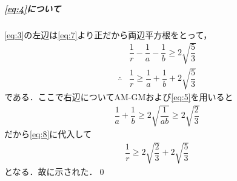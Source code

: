 \documentclass[../../main.tex]{subfiles}
\begin{document}
\subparagraph{\cref{eq:4}について}

\cref{eq:3}の左辺は\cref{eq:7}より正だから両辺平方根をとって，
\begin{align}
  & \dfrac{1}{r}-\dfrac{1}{a}-\dfrac{1}{b}\ge 2\sqrt{\dfrac{5}{3}} \\
  \therefore
  & \dfrac{1}{r} \ge \dfrac{1}{a} + \dfrac{1}{b} + 2\sqrt{\dfrac{5}{3}} \label{eq:8}
\end{align}
である．ここで右辺についてAM-GMおよび\cref{eq:5}を用いると
\begin{align}
  \dfrac{1}{a} + \dfrac{1}{b} \ge 2\sqrt{\dfrac{1}{ab}} \ge 2\sqrt{\dfrac{2}{3}}
\end{align}
だから\cref{eq:8}に代入して
\begin{align}
  \dfrac{1}{r} \ge 2\sqrt{\dfrac{2}{3}} + 2\sqrt{\dfrac{5}{3}}
\end{align}
となる．故に示された．\qed

\newpage
\end{document}
